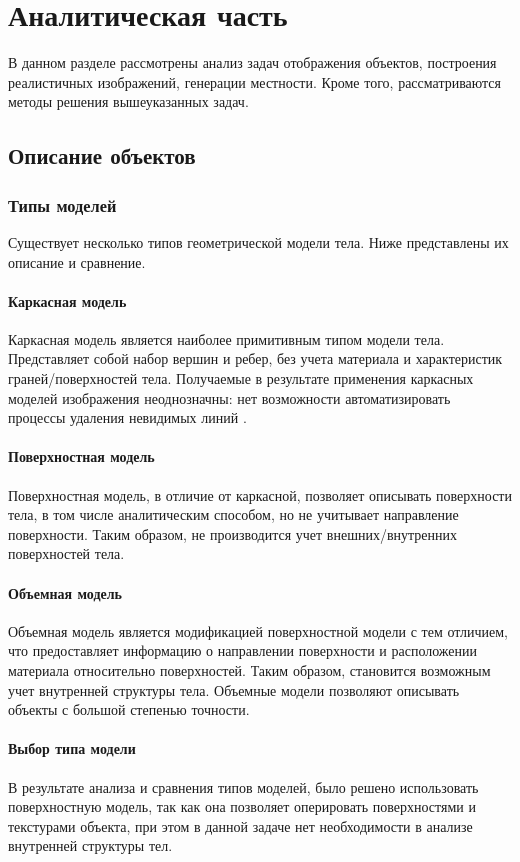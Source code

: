 \chapter{Аналитическая часть}
В данном разделе рассмотрены анализ задач отображения объектов, построения реалистичных изображений, генерации местности. Кроме того, рассматриваются методы решения вышеуказанных задач.

\section{Описание объектов}

\subsection{Типы моделей}
Существует несколько типов геометрической модели тела. Ниже представлены их описание и сравнение.

\subsubsection{Каркасная модель}
Каркасная модель является наиболее примитивным типом модели тела. Представляет собой набор вершин и ребер, без учета материала и характеристик граней/поверхностей тела. Получаемые в результате применения каркасных моделей изображения неоднозначны: нет возможности автоматизировать процессы удаления невидимых линий \cite{bib:10}.

\subsubsection{Поверхностная модель}
Поверхностная модель, в отличие от каркасной, позволяет описывать поверхности тела, в том числе аналитическим способом, но не учитывает направление поверхности. Таким образом, не производится учет внешних/внутренних поверхностей тела.

\subsubsection{Объемная модель}
Объемная модель является модификацией поверхностной модели с тем отличием, что предоставляет информацию  о направлении поверхности и расположении материала относительно поверхностей. Таким образом, становится возможным учет внутренней структуры тела. Объемные модели позволяют описывать объекты с большой степенью точности.

\subsubsection{Выбор типа модели}
В результате анализа и сравнения типов моделей, было решено использовать поверхностную модель, так как она позволяет оперировать поверхностями и текстурами объекта, при этом в данной задаче нет необходимости в анализе внутренней структуры тел.

